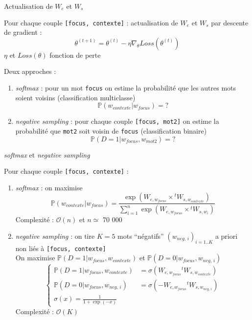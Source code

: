 \documentclass[10pt,xcolor=table,color={dvipsnames,usenames},ignorenonframetext,usepdftitle=false,french]{beamer}
\providecommand{\tightlist}{%
  \setlength{\parskip}{0pt}
  }
\begin{document}
\begin{frame}[fragile]{Actualisation de \(W_e\) et \(W_s\)}
\protect\hypertarget{actualisation-de-w_e-et-w_s}{}

Pour chaque couple \texttt{{[}focus,\ contexte{]}} : actualisation de
\(W_e\) et \(W_s\) par descente de gradient : \[
\theta^{(t+1)} = \theta^{(t)} - \eta \nabla_\theta Loss(\theta^{(t)})
\] \(\eta\)  et \(Loss(\theta)\)
fonction de perte

\pause

Deux approches :

\begin{enumerate}
[1.]
\tightlist
\item
  \emph{softmax} : pour un mot \texttt{focus} on estime la probabilité
  que les autres mots soient voisins (classification multiclasse) \[
  \mathbb P(w_{contexte}\vert w_{focus}) = ?
  \] \pause
\item
  \emph{negative sampling} : pour chaque couple
  \texttt{{[}focus,\ mot2{]}} on estime la probabilité que \texttt{mot2}
  soit voisin de \texttt{focus} (classification binaire) \[
  \mathbb P(D=1\vert w_{focus},w_{mot2}) = ?
  \]
\end{enumerate}

\end{frame}

\begin{frame}[fragile]{\emph{softmax} et \emph{negative sampling}}
\protect\hypertarget{softmax-et-negative-sampling-1}{}

Pour chaque couple \texttt{{[}focus,\ contexte{]}} :

\begin{enumerate}
[1.]
\item
  \emph{softmax} : on maximise \[
  \mathbb P(w_{contexte}\vert w_{focus}) = 
  \frac{
  \exp(W_{e,w_{focus}}\times {}^tW_{s,w_{contexte}})
  }{
  \sum_{i=1}^n\exp(W_{e,w_{focus}}\times {}^tW_{s,w_{i}})
  }
  \] \bcsmmh Complexité : \(\mathcal O (n)\) et \(n\simeq\) 70 000
  \pause
\item
  \emph{negative sampling} : on tire \(K=5\) mots “négatifs”
  \((w_{neg,\,i})_{i=1..K}\) a priori non liés à
  \texttt{{[}focus,\ contexte{]}}\\
  On maximise \(\mathbb P(D=1\vert w_{focus},w_{contexte})\) et
  \(\mathbb P(D=0\vert w_{focus},w_{neg,\,i})\) \[
  \begin{cases}
  \mathbb P(D=1\vert w_{focus},w_{contexte})&=\sigma(W_{e,w_{focus}}{}^tW_{s,w_{contexte}})  \\
  \mathbb P(D=0\vert w_{focus},w_{neg,\,i})&=\sigma(-W_{e,w_{focus}}{}^tW_{s,w_{neg,\,i}}) 
  \\\sigma(x)=\frac{1}{1+\exp(-x)}
  \end{cases}
  \] \bcsmbh Complexité : \(\mathcal O (K)\)
\end{enumerate}

\end{frame}
\end{document}
